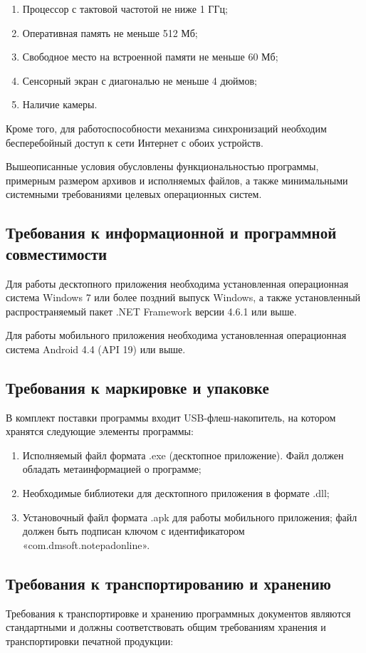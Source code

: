 ﻿\documentclass[techtask]{espd}
\begin{document}
\begin{enumerate}
\item Процессор с тактовой частотой не ниже 1 ГГц;
\item Оперативная память не меньше 512 Мб;
\item Свободное место на встроенной памяти не меньше 60 Мб;
\item Сенсорный экран с диагональю не меньше 4 дюймов;
\item Наличие камеры.
\end{enumerate}

Кроме того, для работоспособности механизма синхронизаций необходим бесперебойный доступ к сети Интернет с обоих устройств.

Вышеописанные условия обусловлены функциональностью программы, примерным размером архивов и исполняемых файлов, а также минимальными системными требованиями целевых операционных систем.

\subsection{Требования к информационной и программной совместимости}
Для работы десктопного приложения необходима установленная операционная система Windows 7 или более поздний выпуск Windows, а также установленный распространяемый пакет .NET Framework версии 4.6.1 или выше.

Для работы мобильного приложения необходима установленная операционная система Android 4.4 (API 19) или выше.

\subsection{Требования к маркировке и упаковке}
В комплект поставки программы входит USB-флеш-накопитель, на котором хранятся следующие элементы программы:

\begin{enumerate}
\item Исполняемый файл формата .exe (десктопное приложение). Файл должен обладать метаинформацией о программе;
\item Необходимые библиотеки для десктопного приложения в формате .dll;
\item Установочный файл формата .apk для работы мобильного приложения; файл должен быть подписан ключом с идентификатором «com.dmsoft.notepadonline».
\end{enumerate}

\subsection{Требования к транспортированию и хранению}
Требования к транспортировке и хранению программных документов являются стандартными и должны соответствовать общим требованиям хранения и транспортировки печатной продукции:
\end{document}

